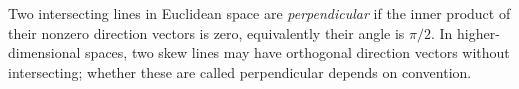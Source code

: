 
Two intersecting lines in Euclidean space are \emph{perpendicular} if the inner product of their nonzero direction vectors is zero, equivalently their angle is $\pi/2$. In higher-dimensional spaces, two skew lines may have orthogonal direction vectors without intersecting; whether these are called perpendicular depends on convention.
